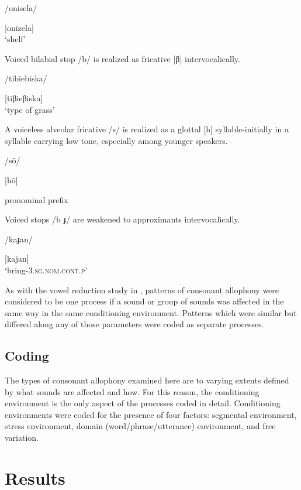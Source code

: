/onisela/

[onizela]\\
\glt ‘shelf’
\citep[30--31]{Bonvillain1973}
\z

\ea\label{ex:7.15}

Voiced bilabial stop /b/ is realized as fricative [β] intervocalically.

/tibiebiska/

[tiβieβiska]\\
\glt ‘type of grass’
\citep[16]{Holt1999}
\z

\ea\label{ex:7.16}

A voiceless alveolar fricative /s/ is realized as a glottal [h] syllable-initially in a syllable carrying low tone, especially among younger speakers.

/sõ/

[hõ]

pronominal prefix
\citep[13]{Yumitani1998}
\z

\ea\label{ex:7.17}

Voiced stops /b ɟ/ are weakened to approximants intervocalically.

/kaɟan/

[kajan]\\
\glt ‘bring-3.\textsc{sg.nom.cont.p}’
\citep[24--25]{Stirtz2011}
\z

  As with the vowel reduction study in , patterns of consonant allophony were considered to be one process if a sound or group of sounds was affected in the same way in the same conditioning environment. Patterns which were similar but differed along any of those parameters were coded as separate processes.

\subsection{Coding}\label{sec:7.2.2}

  The types of consonant allophony examined here are to varying extents defined by what sounds are affected and how. For this reason, the conditioning environment is the only aspect of the processes coded in detail. Conditioning environments were coded for the presence of four factors: segmental environment, stress environment, domain (word/phrase/utterance) environment, and free variation.

\section{Results}\label{sec:7.3}
